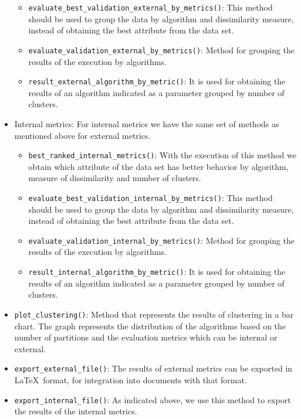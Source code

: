 \begin{itemize}
\begin{itemize}
      \item \texttt{evaluate\_best\_validation\_external\_by\_metrics()}: This method should be used to group the data by algorithm and dissimilarity measure, instead of obtaining the best attribute from the data set.
      \item \texttt{evaluate\_validation\_external\_by\_metrics()}: Method for grouping the results of the execution by algorithms.
      \item \texttt{result\_external\_algorithm\_by\_metric()}: It is used for obtaining the results of an algorithm indicated as a parameter grouped by number of clusters.
\end{itemize}
  \item Internal metrics: For internal metrics we have the same set of methods as mentioned above for external metrics.
  \begin{itemize}
    \item \texttt{best\_ranked\_internal\_metrics()}: With the execution of this method we obtain which attribute of the data set has better behavior by algorithm, measure of dissimilarity and number of clusters.
    \item \texttt{evaluate\_best\_validation\_internal\_by\_metrics()}: This method should be used to group the data by algorithm and dissimilarity measure, instead of obtaining the best attribute from the data set.
    \item \texttt{evaluate\_validation\_internal\_by\_metrics()}: Method for grouping the results of the execution by algorithms.
    \item \texttt{result\_internal\_algorithm\_by\_metric()}: It is used for obtaining the results of an algorithm indicated as a parameter grouped by number of clusters.
  \end{itemize}
    \item \texttt{plot\_clustering()}: Method that represents the results of clustering in a bar chart. The graph represents the distribution of the algorithms based on the number of partitions and the evaluation metrics which can be internal or external.
    \item \texttt{export\_external\_file()}: The results of external metrics can be exported in \LaTeX\ format, for integration into documents with that format.
    \item \texttt{export\_internal\_file()}: As indicated above, we use this method to export the results of the internal metrics.
\end{itemize}

